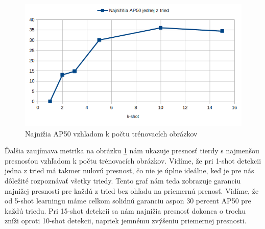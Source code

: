 \begin{figure}[H]
\includegraphics[width=\textwidth]{images/results_lowest_AP50.png}
\centering
\caption{Najnižia AP50 vzhľadom k počtu trénovacích obrázkov}
\label{fig:image39}
\end{figure}

Ďalšia zaujímava metrika na obrázku \ref{fig:image39} nám ukazuje presnosť tierdy s najmenšou presnosťou vzhľadom k počtu trénovacích obrázkov. Vidíme, že pri 1-shot detekcii jedna z tried má takmer nulovú presnosť, čo nie je úplne ideálne, keď je pre nás dôležité rozpoznávať všetky triedy. Tento graf nám teda zobrazuje garanciu najnižej presnosti pre každú z tried bez ohľadu na priemernú prenosť. Vidíme, že od 5-shot learningu máme celkom solidnú garanciu aspon 30 percent AP50 pre každú triedu. Pri 15-shot detekcii sa nám najnižia presnosť dokonca o trochu zníži oproti 10-shot detekcii, napriek jemnému zvýšeniu priemernej presnosti. 






